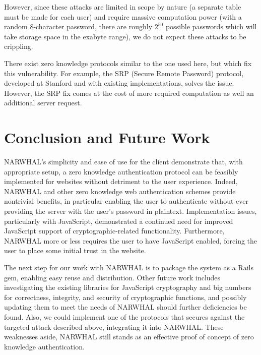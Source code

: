 \documentclass[11pt]{article}
\begin{document}
However, since these attacks are limited in scope by nature (a separate table must be made for each user) and require massive computation power (with a random 8-character password, there are roughly $2^50$ possible passwords which will take storage space in the exabyte range), we do not expect these attacks to be crippling.

There exist zero knowledge protocols similar to the one used here, but which fix this vulnerability.  For example, the SRP (Secure Remote Password) protocol, developed at Stanford and with existing implementations, solves the issue.  However, the SRP fix comes at the cost of more required computation as well an additional server request. \cite{Wu} 

\section{Conclusion and Future Work}

NARWHAL's simplicity and ease of use for the client demonstrate that, with appropriate setup, a zero knowledge authentication protocol can be feasibly implemented for websites without detriment to the user experience.  Indeed, NARWHAL and other zero knowledge web authentication schemes provide nontrivial benefits, in particular enabling the user to authenticate without ever providing the server with the user's password in plaintext. Implementation issues, particularly with JavaScript, demonstrated a continued need for improved JavaScript support of cryptographic-related functionality.  Furthermore, NARWHAL more or less requires the user to have JavaScript enabled, forcing the user to place some initial trust in the website.

The next step for our work with NARWHAL is to package the system as a Rails gem, enabling easy reuse and distribution.  Other future work includes investigating the existing libraries for JavaScript cryptography and big numbers for correctness, integrity, and security of cryptographic functions, and possibly updating them to meet the needs of NARWHAL should further deficiencies be found.  Also, we could implement one of the protocols that secures against the targeted attack described above, integrating it into NARWHAL. These weaknesses aside, NARWHAL still stands as an effective proof of concept of zero knowledge authentication.
\end{document}
